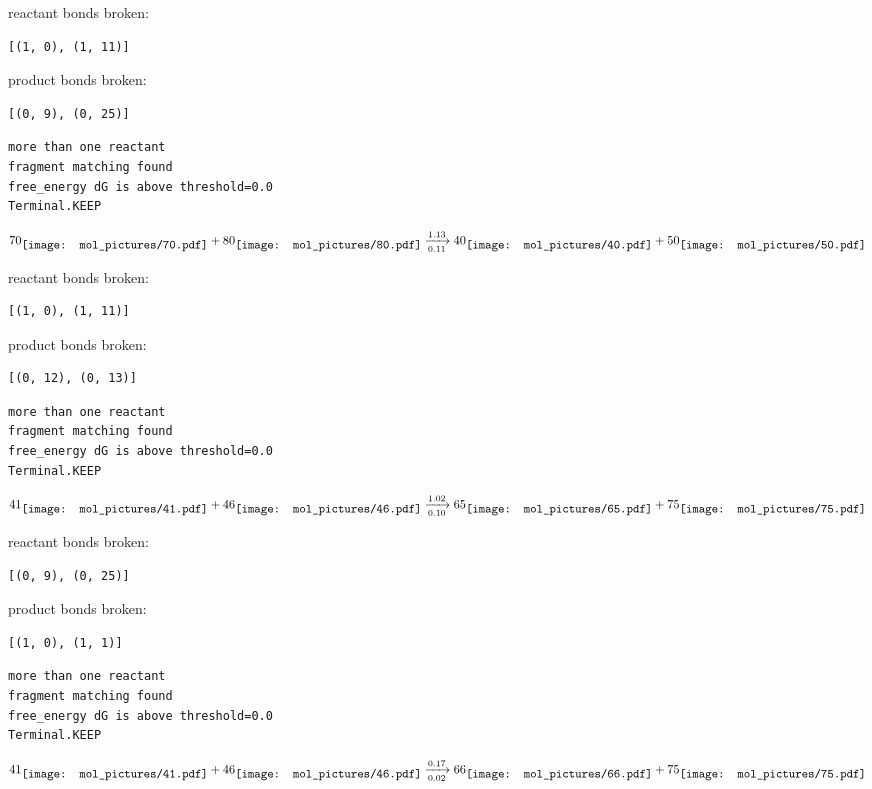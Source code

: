 \documentclass{article}
\begin{document}
reactant bonds broken:\begin{verbatim}
[(1, 0), (1, 11)]
\end{verbatim}
product bonds broken:\begin{verbatim}
[(0, 9), (0, 25)]
\end{verbatim}




\vspace{1cm}
\begin{verbatim}
more than one reactant
fragment matching found
free_energy dG is above threshold=0.0
Terminal.KEEP
\end{verbatim}
$$
70
\raisebox{-.5\height}{\texttt{[image: mol\_pictures/70.pdf]}}
+
80
\raisebox{-.5\height}{\texttt{[image: mol\_pictures/80.pdf]}}
\xrightarrow[0.11]{1.13}
40
\raisebox{-.5\height}{\texttt{[image: mol\_pictures/40.pdf]}}
+
50
\raisebox{-.5\height}{\texttt{[image: mol\_pictures/50.pdf]}}
$$


reactant bonds broken:\begin{verbatim}
[(1, 0), (1, 11)]
\end{verbatim}
product bonds broken:\begin{verbatim}
[(0, 12), (0, 13)]
\end{verbatim}




\vspace{1cm}
\begin{verbatim}
more than one reactant
fragment matching found
free_energy dG is above threshold=0.0
Terminal.KEEP
\end{verbatim}
$$
41
\raisebox{-.5\height}{\texttt{[image: mol\_pictures/41.pdf]}}
+
46
\raisebox{-.5\height}{\texttt{[image: mol\_pictures/46.pdf]}}
\xrightarrow[0.10]{1.02}
65
\raisebox{-.5\height}{\texttt{[image: mol\_pictures/65.pdf]}}
+
75
\raisebox{-.5\height}{\texttt{[image: mol\_pictures/75.pdf]}}
$$


reactant bonds broken:\begin{verbatim}
[(0, 9), (0, 25)]
\end{verbatim}
product bonds broken:\begin{verbatim}
[(1, 0), (1, 1)]
\end{verbatim}




\vspace{1cm}
\begin{verbatim}
more than one reactant
fragment matching found
free_energy dG is above threshold=0.0
Terminal.KEEP
\end{verbatim}
$$
41
\raisebox{-.5\height}{\texttt{[image: mol\_pictures/41.pdf]}}
+
46
\raisebox{-.5\height}{\texttt{[image: mol\_pictures/46.pdf]}}
\xrightarrow[0.02]{0.17}
66
\raisebox{-.5\height}{\texttt{[image: mol\_pictures/66.pdf]}}
+
75
\raisebox{-.5\height}{\texttt{[image: mol\_pictures/75.pdf]}}
$$
\end{document}
